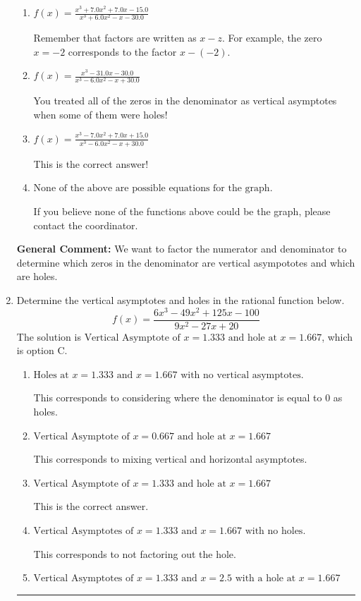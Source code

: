 \documentclass{extbook}[14pt]
\newcommand{\litem}[1]{\item #1

\rule{\textwidth}{0.4pt}}
\begin{document}
\begin{enumerate}
{\begin{enumerate}[label=\Alph*.]
You treated all of the zeros in the denominator as vertical asmptotes when some of them were holes and wrote factors as $x+z$.
\item \( f(x)=\frac{x^{3} +7.0 x^{2} +7.0 x -15.0}{x^{3} +6.0 x^{2} -x -30.0} \)

Remember that factors are written as $x-z$. For example, the zero $x=-2$ corresponds to the factor $x-(-2)$.
\item \( f(x)=\frac{x^{3} -31.0 x -30.0}{x^{3} -6.0 x^{2} -x + 30.0} \)

You treated all of the zeros in the denominator as vertical asymptotes when some of them were holes!
\item \( f(x)=\frac{x^{3} -7.0 x^{2} +7.0 x + 15.0}{x^{3} -6.0 x^{2} -x + 30.0} \)

This is the correct answer!
\item \( \text{None of the above are possible equations for the graph.} \)

If you believe none of the functions above could be the graph, please contact the coordinator.
\end{enumerate}

\textbf{General Comment:} We want to factor the numerator and denominator to determine which zeros in the denominator are vertical asympototes and which are holes.
}
\litem{
Determine the vertical asymptotes and holes in the rational function below.
\[ f(x) = \frac{6x^{3} -49 x^{2} +125 x -100}{9x^{2} -27 x + 20} \]The solution is \( \text{Vertical Asymptote of } x = 1.333 \text{ and hole at } x = 1.667 \), which is option C.\begin{enumerate}[label=\Alph*.]
\item \( \text{Holes at } x = 1.333 \text{ and } x = 1.667 \text{ with no vertical asymptotes.} \)

This corresponds to considering where the denominator is equal to 0 as holes.
\item \( \text{Vertical Asymptote of } x = 0.667 \text{ and hole at } x = 1.667 \)

This corresponds to mixing vertical and horizontal asymptotes.
\item \( \text{Vertical Asymptote of } x = 1.333 \text{ and hole at } x = 1.667 \)

This is the correct answer.
\item \( \text{Vertical Asymptotes of } x = 1.333 \text{ and } x = 1.667 \text{ with no holes.} \)

This corresponds to not factoring out the hole.
\item \( \text{Vertical Asymptotes of } x = 1.333 \text{ and } x = 2.5 \text{ with a hole at } x = 1.667 \)


\end{enumerate}}
\end{enumerate}
\end{document}
